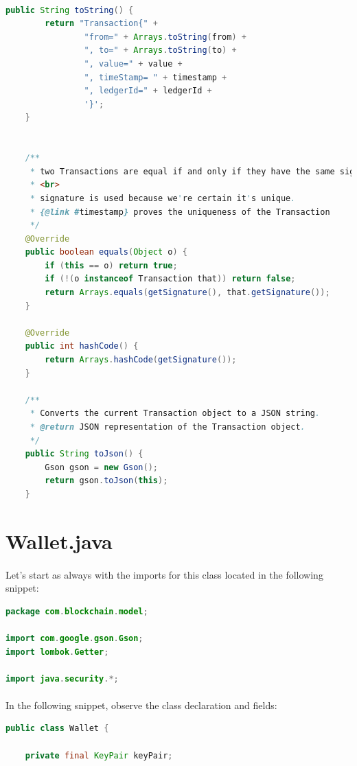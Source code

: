 \documentclass[12pt,a4paper]{report}
\begin{document}
\paragraph{}



\begin{lstlisting}[language=Java]
public String toString() {
        return "Transaction{" +
                "from=" + Arrays.toString(from) +
                ", to=" + Arrays.toString(to) +
                ", value=" + value +
                ", timeStamp= " + timestamp +
                ", ledgerId=" + ledgerId +
                '}';
    }


    /**
     * two Transactions are equal if and only if they have the same signature
     * <br>
     * signature is used because we're certain it's unique.
     * {@link #timestamp} proves the uniqueness of the Transaction
     */
    @Override
    public boolean equals(Object o) {
        if (this == o) return true;
        if (!(o instanceof Transaction that)) return false;
        return Arrays.equals(getSignature(), that.getSignature());
    }

    @Override
    public int hashCode() {
        return Arrays.hashCode(getSignature());
    }

    /**
     * Converts the current Transaction object to a JSON string.
     * @return JSON representation of the Transaction object.
     */
    public String toJson() {
        Gson gson = new Gson();
        return gson.toJson(this);
    }

\end{lstlisting}





\section{Wallet.java}
\paragraph{}
Let’s start as always with the imports for this class located in the following 
snippet:

\begin{lstlisting}[language=Java]
package com.blockchain.model;

import com.google.gson.Gson;
import lombok.Getter;

import java.security.*;
\end{lstlisting}
\paragraph{}
 In the following snippet, observe the class declaration and fields:
 \begin{lstlisting}[language=Java]
public class Wallet {

    private final KeyPair keyPair;
\end{lstlisting}
\end{document}
